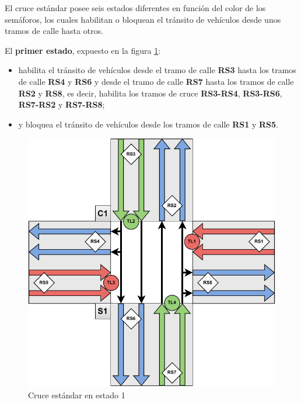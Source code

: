 El cruce estándar posee seis estados diferentes en función del color de los semáforos, los cuales habilitan o bloquean el tránsito de vehículos desde unos tramos de calle hasta otros.

El \textbf{primer estado}, expuesto en la figura \ref{fig:cruce_estandar_estado_1}:
\begin{itemize}
    \item habilita el tránsito de vehículos desde el tramo de calle \textbf{RS3} hasta los tramos de calle \textbf{RS4} y \textbf{RS6} y desde el tramo de calle \textbf{RS7} hasta los tramos de calle \textbf{RS2} y \textbf{RS8}, es decir, habilita los tramos de cruce \textbf{RS3-RS4}, \textbf{RS3-RS6}, \textbf{RS7-RS2} y \textbf{RS7-RS8};
    \item y bloquea el tránsito de vehículos desde los tramos de calle \textbf{RS1} y \textbf{RS5}.
\end{itemize}
\begin{figure}[H]
    \centering
    \includegraphics[width=1\linewidth]{text/image/DCruc-CE-Estado1.pdf}
    \caption{Cruce estándar en estado 1}
    \label{fig:cruce_estandar_estado_1}
\end{figure}

